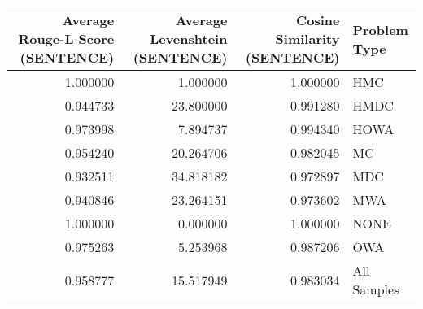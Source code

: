 \begin{tabular}{rrrl}
\toprule
Average Rouge-L Score (SENTENCE) & Average Levenshtein (SENTENCE) & Cosine Similarity (SENTENCE) & Problem Type \\
\midrule
1.000000 & 1.000000 & 1.000000 & HMC \\
0.944733 & 23.800000 & 0.991280 & HMDC \\
0.973998 & 7.894737 & 0.994340 & HOWA \\
0.954240 & 20.264706 & 0.982045 & MC \\
0.932511 & 34.818182 & 0.972897 & MDC \\
0.940846 & 23.264151 & 0.973602 & MWA \\
1.000000 & 0.000000 & 1.000000 & NONE \\
0.975263 & 5.253968 & 0.987206 & OWA \\
0.958777 & 15.517949 & 0.983034 & All Samples \\
\bottomrule
\end{tabular}
